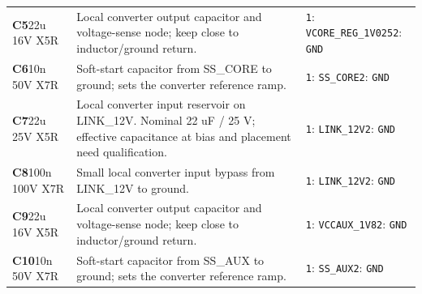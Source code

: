 \documentclass[11pt,a4paper]{article}
\begin{document}
\begin{longtable}{@{}P{27mm}P{84mm}P{57mm}@{}}
\textbf{C5}\newline 22u 16V X5R & Local converter output capacitor and voltage-sense node; keep close to inductor/ground return. & \nolinkurl{1}: \nolinkurl{VCORE_REG_1V025}\newline \nolinkurl{2}: \nolinkurl{GND} \\
\textbf{C6}\newline 10n 50V X7R & Soft-start capacitor from SS\_CORE to ground; sets the converter reference ramp. & \nolinkurl{1}: \nolinkurl{SS_CORE}\newline \nolinkurl{2}: \nolinkurl{GND} \\
\textbf{C7}\newline 22u 25V X5R & Local converter input reservoir on LINK\_12V. Nominal 22 uF / 25 V; effective capacitance at bias and placement need qualification. & \nolinkurl{1}: \nolinkurl{LINK_12V}\newline \nolinkurl{2}: \nolinkurl{GND} \\
\textbf{C8}\newline 100n 100V X7R & Small local converter input bypass from LINK\_12V to ground. & \nolinkurl{1}: \nolinkurl{LINK_12V}\newline \nolinkurl{2}: \nolinkurl{GND} \\
\textbf{C9}\newline 22u 16V X5R & Local converter output capacitor and voltage-sense node; keep close to inductor/ground return. & \nolinkurl{1}: \nolinkurl{VCCAUX_1V8}\newline \nolinkurl{2}: \nolinkurl{GND} \\
\textbf{C10}\newline 10n 50V X7R & Soft-start capacitor from SS\_AUX to ground; sets the converter reference ramp. & \nolinkurl{1}: \nolinkurl{SS_AUX}\newline \nolinkurl{2}: \nolinkurl{GND} \\

\end{longtable}
\end{document}

